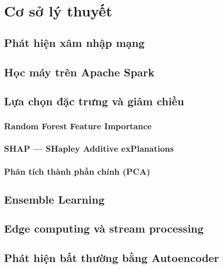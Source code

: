 \chapter{Cơ sở lý thuyết}

\section{Phát hiện xâm nhập mạng}


\section{Học máy trên Apache Spark}


\section{Lựa chọn đặc trưng và giảm chiều}

\subsection{Random Forest Feature Importance}
\subsection{SHAP --- SHapley Additive exPlanations~\cite{lundberg2017unified}}
\subsection{Phân tích thành phần chính (PCA)}

\section{Ensemble Learning}


\section{Edge computing và stream processing}


\section{Phát hiện bất thường bằng Autoencoder}

